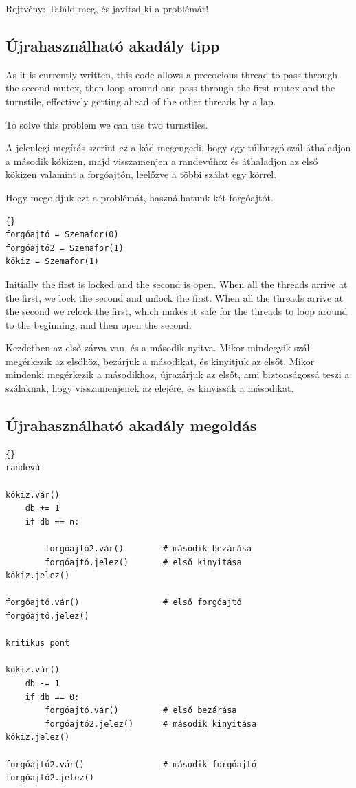 \documentclass{book}
\newcommand{\clearemptydoublepage}{\newpage\cleardoublepage}
\begin{document}
Rejtvény: Találd meg, és javítsd ki a problémát!

\clearemptydoublepage
\subsection{Újrahasználható akadály tipp}

As it is currently written, this code
allows a precocious thread to pass through the second mutex,
then loop around and pass through the first mutex and the
turnstile, effectively getting ahead of the other threads by
a lap.

To solve this problem we can use two turnstiles.

A jelenlegi megírás szerint ez a kód megengedi, hogy egy túlbuzgó
szál áthaladjon a második kökizen, majd visszamenjen a randevúhoz és áthaladjon
az első kökizen valamint a forgóajtón, leelőzve a többi szálat egy körrel.

Hogy megoldjuk ezt a problémát, használhatunk két forgóajtót.

\begin{lstlisting}[title={Újrahasználható akadály tipp}]{}
forgóajtó = Szemafor(0)
forgóajtó2 = Szemafor(1)
kökiz = Szemafor(1)
\end{lstlisting}

Initially the first is locked and the second is open.  When all the
threads arrive at the first, we lock the second and unlock the first.
When all the threads arrive at the second we relock the first,
which makes it safe for the threads to loop around to the beginning,
and then open the second.

Kezdetben az első zárva van, és a második nyitva. Mikor mindegyik
szál megérkezik az elsőhöz, bezárjuk a másodikat, és kinyitjuk az elsőt.
Mikor mindenki megérkezik a másodikhoz, újrazárjuk az elsőt, ami
biztonságossá teszi a szálaknak, hogy visszamenjenek az elejére,
és kinyissák a másodikat.

\clearemptydoublepage
\subsection{Újrahasználható akadály megoldás}

\begin{lstlisting}[title={Újrahasználható akadály megoldás}]{}
randevú

kökiz.vár()
    db += 1
    if db == n:
        
        forgóajtó2.vár()        # második bezárása
        forgóajtó.jelez()       # első kinyitása
kökiz.jelez()

forgóajtó.vár()                 # első forgóajtó
forgóajtó.jelez()

kritikus pont

kökiz.vár()
    db -= 1
    if db == 0: 
        forgóajtó.vár()         # első bezárása
        forgóajtó2.jelez()      # második kinyitása
kökiz.jelez()

forgóajtó2.vár()                # második forgóajtó
forgóajtó2.jelez()
\end{lstlisting}
\end{document}
